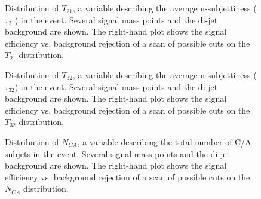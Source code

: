 


\begin{figure}
\centering
{}
\label{fig:search:search:optimization:T21}
\caption{Distribution of $T_{21}$, a variable describing the average n-subjettiness ($\tau_{21}$) in the event. Several signal mass points and the \herwigpp di-jet background are shown. The right-hand plot shows the signal efficiency vs. background rejection of a scan of possible cuts on the $T_{21}$ distribution.}
\end{figure}



\begin{figure}
\centering
{}
\label{fig:search:search:optimization:T32}
\caption{Distribution of $T_{32}$, a variable describing the average n-subjettiness ($\tau_{32}$) in the event. Several signal mass points and the \herwigpp di-jet background are shown. The right-hand plot shows the signal efficiency vs. background rejection of a scan of possible cuts on the $T_{32}$ distribution.}
\end{figure}





\begin{figure}
\centering
{}
\label{fig:search:search:optimization:NCA}
\caption{Distribution of $N_{CA}$, a variable describing the total number of C/A subjets in the event. Several signal mass points and the \herwigpp di-jet background are shown. The right-hand plot shows the signal efficiency vs. background rejection of a scan of possible cuts on the $N_{CA}$ distribution.}
\end{figure}

